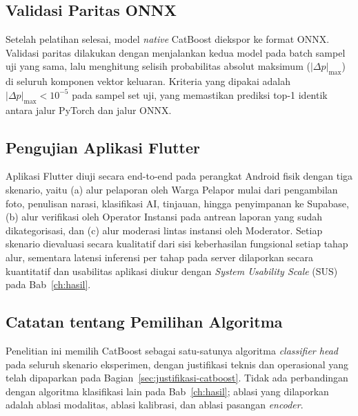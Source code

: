 \subsection{Validasi Paritas ONNX}

Setelah pelatihan selesai, model \textit{native} CatBoost diekspor ke format ONNX. Validasi paritas dilakukan dengan menjalankan kedua model pada batch sampel uji yang sama, lalu menghitung selisih probabilitas absolut maksimum ($|\Delta p|_{\max}$) di seluruh komponen vektor keluaran. Kriteria yang dipakai adalah $|\Delta p|_{\max} < 10^{-5}$ pada sampel set uji, yang memastikan prediksi top-1 identik antara jalur PyTorch dan jalur ONNX.

\subsection{Pengujian Aplikasi Flutter}

Aplikasi Flutter diuji secara end-to-end pada perangkat Android fisik dengan tiga skenario, yaitu (a) alur pelaporan oleh Warga Pelapor mulai dari pengambilan foto, penulisan narasi, klasifikasi AI, tinjauan, hingga penyimpanan ke Supabase, (b) alur verifikasi oleh Operator Instansi pada antrean laporan yang sudah dikategorisasi, dan (c) alur moderasi lintas instansi oleh Moderator. Setiap skenario dievaluasi secara kualitatif dari sisi keberhasilan fungsional setiap tahap alur, sementara latensi inferensi per tahap pada server dilaporkan secara kuantitatif dan usabilitas aplikasi diukur dengan \textit{System Usability Scale} (SUS) pada Bab~\ref{ch:hasil}.

\subsection{Catatan tentang Pemilihan Algoritma}

Penelitian ini memilih CatBoost sebagai satu-satunya algoritma \textit{classifier head} pada seluruh skenario eksperimen, dengan justifikasi teknis dan operasional yang telah dipaparkan pada Bagian~\ref{sec:justifikasi-catboost}. Tidak ada perbandingan dengan algoritma klasifikasi lain pada Bab~\ref{ch:hasil}; ablasi yang dilaporkan adalah ablasi modalitas, ablasi kalibrasi, dan ablasi pasangan \textit{encoder}.

\bigskip

